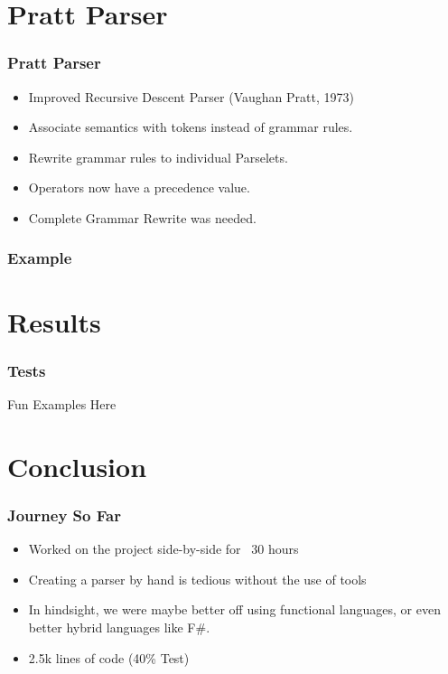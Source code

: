 \documentclass{beamer}
\begin{document}
\section{Pratt Parser}

\begin{frame}
    \frametitle{Pratt Parser}

    \begin{itemize}
        \item Improved Recursive Descent Parser (Vaughan Pratt, 1973)
        \item Associate semantics with tokens instead of grammar rules.
        \item Rewrite grammar rules to individual Parselets.
        \item Operators now have a precedence value.
        \item Complete Grammar Rewrite was needed.
    \end{itemize}
\end{frame}

\begin{frame}
    \frametitle{Example}
    
\end{frame}


\section{Results}

\begin{frame}
    \frametitle{Tests}
    Fun Examples Here
\end{frame}

\section{Conclusion}

\begin{frame}
    \frametitle{Journey So Far}
    
    \begin{itemize}
        \item Worked on the project side-by-side for ~30 hours
        \item Creating a parser by hand is tedious without the use of tools
        \item In hindsight, we were maybe better off using functional languages, or even better hybrid languages like F\#.
        \item 2.5k lines of code (40\% Test)
    \end{itemize}
\end{frame}
\end{document}
